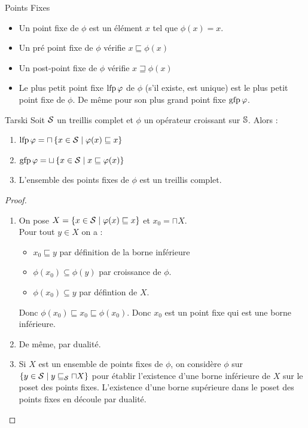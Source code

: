\documentclass{cours}
\begin{document}
\begin{définition}{Points Fixes}{}
\begin{itemize}
	\item Un point fixe de $\phi$ est un élément $x$ tel que $\phi(x) = x$.
	\item Un pré point fixe de $\phi$ vérifie $x \sqsubseteq \phi(x)$
	\item Un post-point fixe de $\phi$ vérifie $x \sqsupseteq \phi(x)$
	\item Le plus petit point fixe $\lfp\phi$ de $\phi$ (s'il existe, est unique) est le plus petit point fixe de $\phi$. De même pour son plus grand point fixe $\gfp\phi$.
\end{itemize}
\end{définition}

\begin{théorème}{Tarski}{}
Soit $\mS$ un treillis complet et $\phi$ un opérateur croissant sur $\S$. Alors :
\begin{enumerate}
	\item $\lfp\phi = \sqcap\left\{x \in \mS \mid \phi(x) \sqsubseteq x\right\}$
	\item $\gfp\phi = \sqcup\left\{x \in \mS \mid x \sqsubseteq \phi(x)\right\}$
	\item L'ensemble des points fixes de $\phi$ est un treillis complet.
\end{enumerate}
\end{théorème}
\begin{proof}
	\begin{enumerate}
		\item On pose $X = \{x \in \mS \mid \phi(x) \sqsubseteq x\}$ et $x_{0} = \sqcap X$.\\
		      Pour tout $y \in X$ on a :
		      \begin{itemize}
			      \item $x_{0} \sqsubseteq y$ par définition de la borne inférieure
			      \item $\phi(x_{0}) \subseteq \phi(y)$ par croissance de $\phi$.
			      \item $\phi(x_{0}) \subseteq y$ par défintion de $X$.
		      \end{itemize}
		      Donc $\phi(x_{0}) \sqsubseteq x_{0} \sqsubseteq \phi(x_{0})$. Donc $x_{0}$ est un point fixe qui est une borne inférieure.
		\item De même, par dualité.
		\item Si $X$ est un ensemble de points fixes de $\phi$, on considère $\phi$ sur $\left\{y \in \mS \mid y \sqsubseteq_{\mS} \sqcap X\right\}$ pour établir l'existence d'une borne inférieure de $X$ sur le poset des points fixes. L'existence d'une borne supérieure dans le poset des points fixes en découle par dualité.
	\end{enumerate}
\end{proof}
\end{document}
